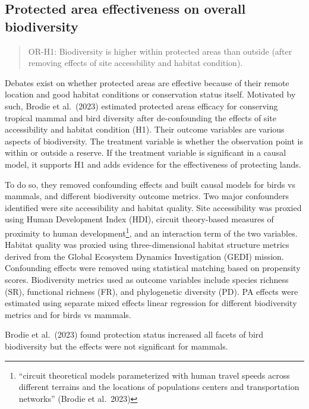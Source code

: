\documentclass[
]{article}
\begin{document}
\hypertarget{protected-area-effectiveness-on-overall-biodiversity}{%
\subsection{Protected area effectiveness on overall
biodiversity}\label{protected-area-effectiveness-on-overall-biodiversity}}

\begin{quote}
OR-H1: Biodiversity is higher within protected areas than outside (after
removing effects of site accessbility and habitat condition).
\end{quote}

Debates exist on whether protected areas are effective because of their
remote location and good habitat conditions or conservation status
itself. Motivated by such, Brodie et al.~(2023) estimated protected
areas efficacy for conserving tropical mammal and bird diversity after
de-confounding the effects of site accessibility and habitat condition
(H1). Their outcome variables are various aspects of biodiversity. The
treatment variable is whether the observation point is within or outside
a reserve. If the treatment variable is significant in a causal model,
it supports H1 and adds evidence for the effectiveness of protecting
lands.

To do so, they removed confounding effects and built causal models for
birds vs mammals, and different biodiversity outcome metrics. Two major
confounders identified were site accessibility and habitat quality. Site
accessibility was proxied using Human Development Index (HDI), circuit
theory-based measures of proximity to human development\footnote{``circuit
  theoretical models parameterized with human travel speeds across
  different terrains and the locations of populations centers and
  transportation networks'' (Brodie et al.~2023)}, and an interaction
term of the two variables. Habitat quality was proxied using
three-dimensional habitat structure metrics derived from the Global
Ecosystem Dynamics Investigation (GEDI) mission. Confounding effects
were removed using statistical matching based on propensity scores.
Biodiversity metrics used as outcome variables include species richness
(SR), functional richness (FR), and phylogenetic diversity (PD). PA
effects were estimated using separate mixed effects linear regression
for different biodiversity metrics and for birds vs mammals.

Brodie et al.~(2023) found protection status increased all facets of
bird biodiversity but the effects were not significant for mammals.
\end{document}
